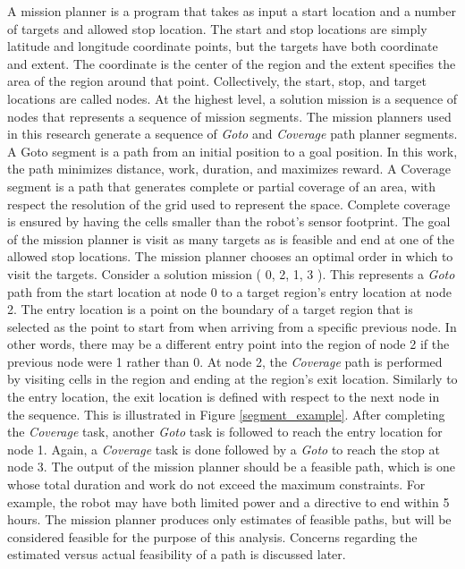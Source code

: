\documentclass{tamuccthesis}
\begin{document}
A mission planner is a program that takes as input a start location and a number of targets and allowed stop location. The start and stop locations are simply latitude and longitude coordinate points,  but the targets have both coordinate and extent. The coordinate is the center of the region and the extent specifies the area of the region around that point. Collectively, the start, stop, and target locations are called nodes. At the highest level, a solution mission is a sequence of nodes that represents a sequence of mission segments. The mission planners used in this research generate a sequence of \textit{Goto} and \textit{Coverage} path planner segments. A Goto segment is a path from an initial position to a goal position. In this work, the path minimizes distance, work, duration, and maximizes reward. A Coverage segment is a path that generates complete or partial coverage of an area, with respect the resolution of the grid used to represent the space. Complete coverage is ensured by having the cells smaller than the robot's sensor footprint. The goal of the mission planner is visit as many targets as is feasible and end at one of the allowed stop locations.  The mission planner chooses an optimal order in which to visit the targets. Consider a solution mission ( 0, 2, 1, 3 ). This represents a \textit{Goto} path from the start location at node 0 to a target region's entry location at node 2. The entry location is a point on the boundary of a target region that is selected as the point to start from when arriving from a specific previous node. In other words, there may be a different entry point into the region of node 2 if the previous node were 1 rather than 0. At node 2, the \textit{Coverage} path is performed by visiting cells in the region and ending at the region's exit location. Similarly to the entry location, the exit location is defined with respect to the next node in the sequence. This is illustrated in Figure \ref{segment_example}. After completing the \textit{Coverage} task, another \textit{Goto} task is followed to reach the entry location for node 1. Again, a \textit{Coverage} task is done followed by a \textit{Goto} to reach the stop at node 3. The output of the mission planner should be a feasible path, which is one whose total duration and work do not exceed the maximum constraints. For example, the robot may have both limited power and a directive to end within 5 hours. The mission planner produces only estimates of feasible paths, but will be considered feasible for the purpose of this analysis. Concerns regarding the estimated versus actual feasibility of a path is discussed later. 
\end{document}
